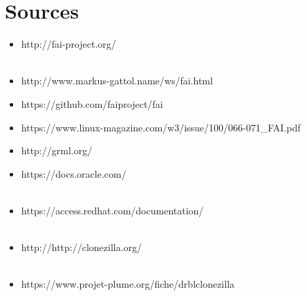 \documentclass[a4paper,12pt,one side,titlepage]{report}
\begin{document}
\chapter{Sources}
\begin{itemize}
  \item http://fai-project.org/\\\\
  \item http://www.markus-gattol.name/ws/fai.html\\
  \item https://github.com/faiproject/fai\\
  \item https://www.linux-magazine.com/w3/issue/100/066-071\_FAI.pdf\\
  \item http://grml.org/\\
  \item https://docs.oracle.com/\\\\
  \item https://access.redhat.com/documentation/\\\\
  \item http://http://clonezilla.org/\\\\
  \item https://www.projet-plume.org/fiche/drblclonezilla\\\\
\end{itemize}
\end{document}
